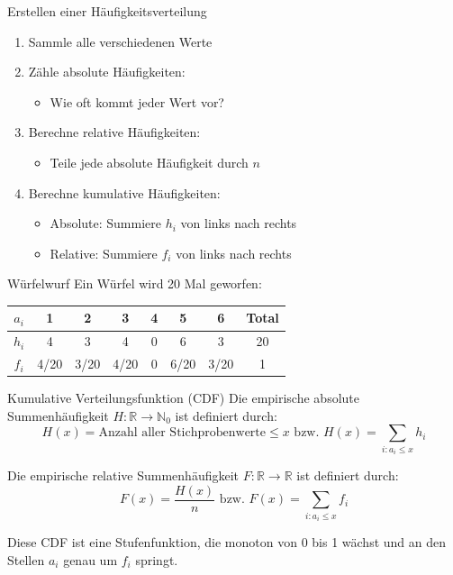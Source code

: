 \begin{KR}{Erstellen einer Häufigkeitsverteilung}
\begin{enumerate}
    \item Sammle alle verschiedenen Werte
    \item Zähle absolute Häufigkeiten:
        \begin{itemize}
            \item Wie oft kommt jeder Wert vor?
        \end{itemize}
    \item Berechne relative Häufigkeiten:
        \begin{itemize}
            \item Teile jede absolute Häufigkeit durch $n$
        \end{itemize}
    \item Berechne kumulative Häufigkeiten:
        \begin{itemize}
            \item Absolute: Summiere $h_i$ von links nach rechts
            \item Relative: Summiere $f_i$ von links nach rechts
        \end{itemize}
\end{enumerate}
\end{KR}

\begin{example2}{Würfelwurf}
Ein Würfel wird 20 Mal geworfen:

\begin{center}
\begin{tabular}{|c|c|c|c|c|c|c|c|}
\hline
$a_i$ & 1 & 2 & 3 & 4 & 5 & 6 & Total \\
\hline 
$h_i$ & 4 & 3 & 4 & 0 & 6 & 3 & 20 \\
\hline
$f_i$ & 4/20 & 3/20 & 4/20 & 0 & 6/20 & 3/20 & 1 \\
\hline
\end{tabular}
\end{center}
\end{example2}

\begin{definition}{Kumulative Verteilungsfunktion (CDF)}
Die empirische absolute Summenhäufigkeit $H: \mathbb{R} \rightarrow \mathbb{N}_0$ ist definiert durch:
$$H(x) = \text{Anzahl aller Stichprobenwerte} \leq x \text{ bzw. } H(x) = \sum_{i:a_i\leq x} h_i$$

Die empirische relative Summenhäufigkeit $F: \mathbb{R} \rightarrow \mathbb{R}$ ist definiert durch:
$$F(x) = \frac{H(x)}{n} \text{ bzw. } F(x) = \sum_{i:a_i\leq x} f_i$$

Diese CDF ist eine Stufenfunktion, die monoton von 0 bis 1 wächst und an den Stellen $a_i$ genau um $f_i$ springt.
\end{definition}

